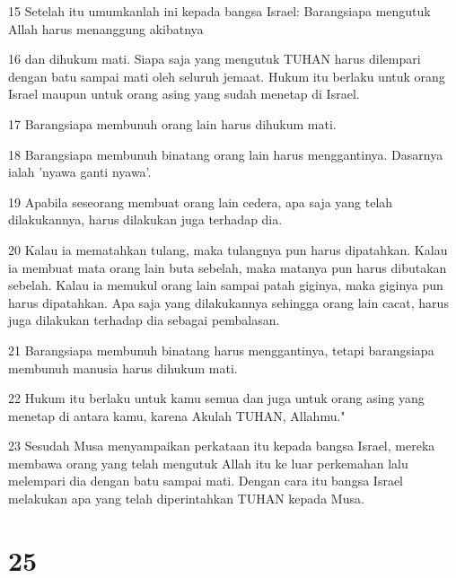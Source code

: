 \par 15 Setelah itu umumkanlah ini kepada bangsa Israel: Barangsiapa mengutuk Allah harus menanggung akibatnya
\par 16 dan dihukum mati. Siapa saja yang mengutuk TUHAN harus dilempari dengan batu sampai mati oleh seluruh jemaat. Hukum itu berlaku untuk orang Israel maupun untuk orang asing yang sudah menetap di Israel.
\par 17 Barangsiapa membunuh orang lain harus dihukum mati.
\par 18 Barangsiapa membunuh binatang orang lain harus menggantinya. Dasarnya ialah 'nyawa ganti nyawa'.
\par 19 Apabila seseorang membuat orang lain cedera, apa saja yang telah dilakukannya, harus dilakukan juga terhadap dia.
\par 20 Kalau ia mematahkan tulang, maka tulangnya pun harus dipatahkan. Kalau ia membuat mata orang lain buta sebelah, maka matanya pun harus dibutakan sebelah. Kalau ia memukul orang lain sampai patah giginya, maka giginya pun harus dipatahkan. Apa saja yang dilakukannya sehingga orang lain cacat, harus juga dilakukan terhadap dia sebagai pembalasan.
\par 21 Barangsiapa membunuh binatang harus menggantinya, tetapi barangsiapa membunuh manusia harus dihukum mati.
\par 22 Hukum itu berlaku untuk kamu semua dan juga untuk orang asing yang menetap di antara kamu, karena Akulah TUHAN, Allahmu."
\par 23 Sesudah Musa menyampaikan perkataan itu kepada bangsa Israel, mereka membawa orang yang telah mengutuk Allah itu ke luar perkemahan lalu melempari dia dengan batu sampai mati. Dengan cara itu bangsa Israel melakukan apa yang telah diperintahkan TUHAN kepada Musa.

\chapter{25}

